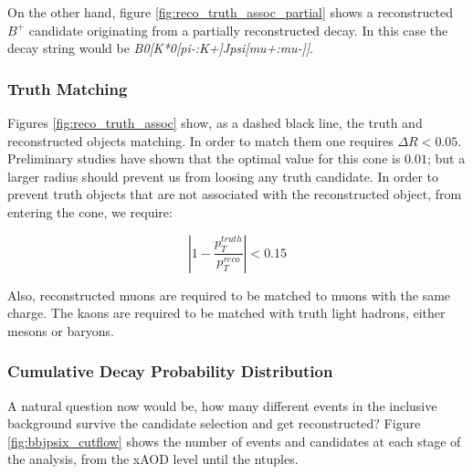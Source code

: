 On the other hand, figure \ref{fig:reco_truth_assoc_partial} shows a reconstructed $B^+$ candidate
originating from a partially reconstructed decay. In this case the decay string would be \textit{B0[K*0[pi-:K+]Jpsi[mu+:mu-]]}.\\

\subsubsection{Truth Matching}
Figures \ref{fig:reco_truth_assoc} show, as a dashed black line, the truth and reconstructed objects matching.
In order to match them one requires $\Delta R < 0.05$. Preliminary studies have shown that the optimal value for this
cone is $0.01$; but a larger radius should prevent us from loosing any truth candidate. In order to prevent truth objects that
are not associated with the reconstructed object, from entering the cone, we require:

\begin{equation}
    \left|1-\frac{p_T^{truth}}{p_T^{reco}}\right|<0.15
\end{equation}

Also, reconstructed muons are required to be matched to muons with the same charge. The kaons are required to be
matched with truth light hadrons, either mesons or baryons.

\subsubsection{Cumulative Decay Probability Distribution}
A natural question now would be, how many different events in the inclusive background survive the 
candidate selection and get reconstructed? Figure \ref{fig:bbjpsix_cutflow} shows the number of events and candidates
at each stage of the analysis, from the xAOD level until the ntuples.

